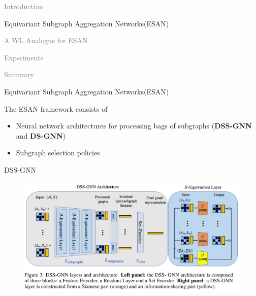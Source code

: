 \documentclass[aspectratio=169,mathserif]{beamer}  %
\newcommand{\light}[1]{\textcolor{gray}{#1}}
\newcommand{\tb}{\textbf}
\begin{document}
\begin{frame}[noframenumbering]
\begin{itemize}
    \begin{LARGE}
    \item \light{Introduction}
    \item Equivariant Subgraph Aggregation Networks(ESAN)
    \item \light{A WL Analogue for ESAN}
    \item \light{Experiments}
    \item \light{Summary}
    \end{LARGE}
\end{itemize}
\end{frame}



\begin{frame}{Equivariant Subgraph Aggregation Networks(ESAN)}

The ESAN framework consists of 
\begin{itemize}[<+->]
    \item Neural network architectures for processing bags of subgraphs (\tb{DSS-GNN} and \tb{DS-GNN})
    \item Subgraph selection policies
\end{itemize}

\end{frame}



\begin{frame}{DSS-GNN}

\begin{figure}[t]
\centerline{\includegraphics[width=0.9\linewidth]{figure3.png}}
\end{figure}

\end{frame}
\end{document}
